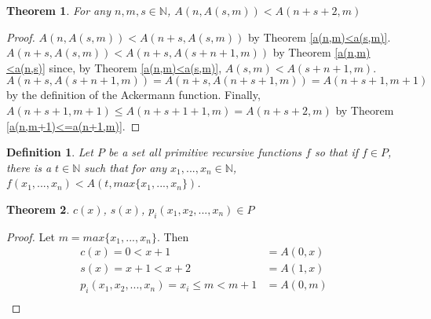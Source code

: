 \documentclass[12pt, letterpaper]{article}
\newtheorem{theorem}{Theorem}
\newtheorem*{definition}{Definition}
\theoremstyle{case}
\begin{document}
    \begin{theorem}
      \label{plus2}
      For any $n, m, s \in \mathbb{N}$, $A(n, A(s, m)) < A(n + s + 2, m)$
    \end{theorem}
    \begin{proof}
      $A(n, A(s, m)) < A(n + s, A(s, m))$ by Theorem \ref{a(n,m)<a(s,m)}.
      $A(n + s, A(s, m)) < A(n + s, A(s + n + 1, m))$ by Theorem \ref{a(n,m)<a(n,s)} since, by Theorem \ref{a(n,m)<a(s,m)},
      $A(s, m) < A(s + n + 1, m)$.
      $A(n + s, A(s + n + 1, m)) = A(n + s, A(n + s + 1, m)) = A(n + s + 1, m + 1)$ by the definition of the Ackermann function.
      Finally, $A(n + s + 1, m + 1) \leq A(n + s + 1 + 1, m) = A(n + s + 2, m)$ by Theorem \ref{a(n,m+1)<=a(n+1,m)}.
    \end{proof}
    
    \begin{definition}
      Let $P$ be a set all primitive recursive functions $f$ so that if $f \in P$, there is a $t \in \mathbb{N}$
      such that for any $x_1, ..., x_n \in \mathbb{N}$, $f(x_1, ..., x_n) < A(t, max\{x_1, ..., x_n\})$.
    \end{definition}

    \begin{theorem}
      $c(x)$, $s(x)$, $p_i(x_1, x_2, ..., x_n) \in P$
    \end{theorem}
    \begin{proof}
      Let $m = max\{x_1, ..., x_n\}$.
      Then
      \begin{equation*}
        \begin{aligned}
          c(x) = 0 < x + 1 &= A(0, x) \\
          s(x) = x + 1 < x + 2 &= A(1, x) \\
          p_i(x_1, x_2, ..., x_n) = x_i \leq m < m + 1 &= A(0, m) \\
        \end{aligned}
      \end{equation*}
    \end{proof}
\end{document}
